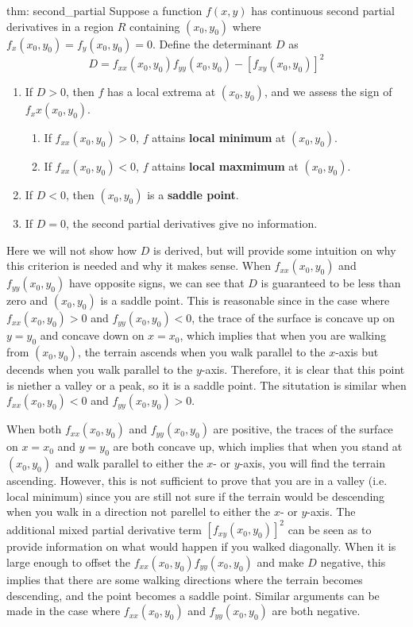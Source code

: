 \begin{theo}{thm: second_partial}
    Suppose a function $f(x, y)$ has continuous second partial derivatives in a region $R$ containing $(x_0, y_0)$ where $f_x(x_0, y_0) = f_y(x_0, y_0) = 0$.  Define the determinant $D$ as
    \[D = f_{xx}(x_0, y_0)f_{yy}(x_0, y_0) - [f_{xy}(x_0, y_0)]^2\]
    \begin{enumerate}
        \item If $D > 0$, then $f$ has a local extrema at $(x_0,y_0)$, and we assess the sign of $f_xx(x_0,y_0)$.
        \begin{enumerate}
            \item If $f_{xx}(x_0,y_0) > 0$, $f$ attains \textbf{local minimum} at $(x_0, y_0)$.
            \item If $f_{xx}(x_0,y_0) < 0$, $f$ attains \textbf{local maxmimum} at $(x_0, y_0)$.
        \end{enumerate}
        \item If $D < 0$, then $(x_0, y_0)$ is a \textbf{saddle point}.
        \item If $D = 0$, the second partial derivatives give no information.
    \end{enumerate}
\end{theo}

Here we will not show how $D$ is derived, but will provide some intuition on why this criterion is needed and why it makes sense.  When $f_{xx}(x_0,y_0)$ and $f_{yy}(x_0,y_0)$ have opposite signs, we can see that $D$ is guaranteed to be less than zero and $(x_0, y_0)$ is a saddle point.  This is reasonable since in the case where $f_{xx}(x_0,y_0) > 0$ and $f_{yy}(x_0,y_0) <0$, the trace of the surface is concave up on $y = y_0$ and concave down on $x = x_0$, which implies that when you are walking from $(x_0, y_0)$, the terrain ascends when you walk parallel to the $x$-axis but decends when you walk parallel to the $y$-axis.  Therefore, it is clear that this point is niether a valley or a peak, so it is a saddle point.  The situtation is similar when $f_{xx}(x_0,y_0) < 0$ and $f_{yy}(x_0,y_0) > 0$.


When both $f_{xx}(x_0,y_0)$ and $f_{yy}(x_0,y_0)$ are positive, the traces of the surface on $x = x_0$ and $y = y_0$ are both concave up, which implies that when you stand at $(x_0, y_0)$ and walk parallel to either the $x$- or $y$-axis, you will find the terrain ascending.  However, this is not sufficient to prove that you are in a valley (i.e. local minimum) since you are still not sure if the terrain would be descending when you walk in a direction not parellel to either the $x$- or $y$-axis.  The additional mixed partial derivative term $[f_{xy}(x_0, y_0)]^2$ can be seen as to provide information on what would happen if you walked diagonally.  When it is large enough to offset the $f_{xx}(x_0,y_0)f_{yy}(x_0,y_0)$ and make $D$ negative, this implies that there are some walking directions where the terrain becomes descending, and the point becomes a saddle point.  Similar arguments can be made in the case where $f_{xx}(x_0,y_0)$ and $f_{yy}(x_0,y_0)$ are both negative.

